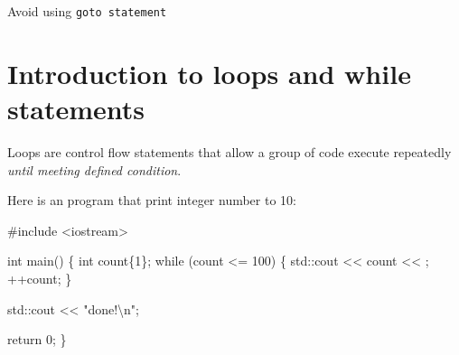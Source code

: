\documentclass[
  letterpaper,
  DIV=11,
  numbers=noendperiod]{scrreprt}
\newenvironment{Shaded}{\begin{snugshade}}{\end{snugshade}}
\newcommand{\CommentTok}[1]{\textcolor[rgb]{0.37,0.37,0.37}{#1}}
\newcommand{\ControlFlowTok}[1]{\textcolor[rgb]{0.00,0.23,0.31}{#1}}
\newcommand{\DecValTok}[1]{\textcolor[rgb]{0.68,0.00,0.00}{#1}}
\newcommand{\ErrorTok}[1]{\textcolor[rgb]{0.68,0.00,0.00}{#1}}
\newcommand{\FunctionTok}[1]{\textcolor[rgb]{0.28,0.35,0.67}{#1}}
\newcommand{\NormalTok}[1]{\textcolor[rgb]{0.00,0.23,0.31}{#1}}
\newcommand{\SpecialCharTok}[1]{\textcolor[rgb]{0.37,0.37,0.37}{#1}}
\newcommand{\StringTok}[1]{\textcolor[rgb]{0.13,0.47,0.30}{#1}}
\begin{document}
\begin{tcolorbox}[enhanced jigsaw, toprule=.15mm, rightrule=.15mm, opacityback=0, breakable, leftrule=.75mm, colback=white, colframe=quarto-callout-tip-color-frame, arc=.35mm, left=2mm, bottomrule=.15mm]
\begin{minipage}[t]{5.5mm}
\textcolor{quarto-callout-tip-color}{\faLightbulb}
\end{minipage}%
\begin{minipage}[t]{\textwidth - 5.5mm}

Avoid using \texttt{goto\ statement}

\end{minipage}%
\end{tcolorbox}

\hypertarget{introduction-to-loops-and-while-statements}{%
\section{Introduction to loops and while
statements}\label{introduction-to-loops-and-while-statements}}

Loops are control flow statements that allow a group of code execute
repeatedly \emph{until meeting defined condition}.

Here is an program that print integer number to 10:

\begin{Shaded}
\begin{Highlighting}[]
\CommentTok{\#include \textless{}iostream\textgreater{}}

\NormalTok{int }\FunctionTok{main}\NormalTok{()}
\NormalTok{\{}
\NormalTok{    int count\{}\DecValTok{1}\NormalTok{\};}
    \ControlFlowTok{while}\NormalTok{ (count }\SpecialCharTok{\textless{}=} \DecValTok{100}\NormalTok{)}
\NormalTok{    \{}
\NormalTok{        std}\SpecialCharTok{::}\NormalTok{cout }\SpecialCharTok{\textless{}}\ErrorTok{\textless{}}\NormalTok{ count }\SpecialCharTok{\textless{}}\ErrorTok{\textless{}} \StringTok{\textquotesingle{} \textquotesingle{}}\NormalTok{;}
        \SpecialCharTok{++}\NormalTok{count;}
\NormalTok{    \}}

\NormalTok{    std}\SpecialCharTok{::}\NormalTok{cout }\SpecialCharTok{\textless{}}\ErrorTok{\textless{}} \StringTok{"done!}\SpecialCharTok{\textbackslash{}n}\StringTok{"}\NormalTok{;}

\NormalTok{    return }\DecValTok{0}\NormalTok{;}
\NormalTok{\}}
\end{Highlighting}
\end{Shaded}
\end{document}
